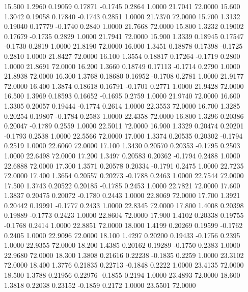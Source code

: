   15.500   1.2960   0.19059   0.17871  -0.1745   0.2864   1.0000  21.7041  72.0000
  15.600   1.3042   0.19058   0.17840  -0.1743   0.2851   1.0000  21.7370  72.0000
  15.700   1.3132   0.19040   0.17779  -0.1740   0.2840   1.0000  21.7668  72.0000
  15.800   1.3232   0.19002   0.17679  -0.1735   0.2829   1.0000  21.7941  72.0000
  15.900   1.3339   0.18945   0.17547  -0.1730   0.2819   1.0000  21.8190  72.0000
  16.000   1.3451   0.18878   0.17398  -0.1725   0.2810   1.0000  21.8427  72.0000
  16.100   1.3554   0.18817   0.17264  -0.1719   0.2800   1.0000  21.8691  72.0000
  16.200   1.3660   0.18749   0.17113  -0.1714   0.2790   1.0000  21.8938  72.0000
  16.300   1.3768   0.18680   0.16952  -0.1708   0.2781   1.0000  21.9177  72.0000
  16.400   1.3874   0.18618   0.16791  -0.1701   0.2771   1.0000  21.9428  72.0000
  16.500   1.3969   0.18593   0.16652  -0.1695   0.2759   1.0000  21.9740  72.0000
  16.600   1.3305   0.20057   0.19444  -0.1774   0.2614   1.0000  22.3553  72.0000
  16.700   1.3285   0.20254   0.19807  -0.1784   0.2583   1.0000  22.4358  72.0000
  16.800   1.3296   0.20386   0.20047  -0.1789   0.2559   1.0000  22.5011  72.0000
  16.900   1.3329   0.20474   0.20201  -0.1793   0.2538   1.0000  22.5566  72.0000
  17.000   1.3374   0.20535   0.20302  -0.1794   0.2519   1.0000  22.6060  72.0000
  17.100   1.3430   0.20570   0.20353  -0.1795   0.2503   1.0000  22.6498  72.0000
  17.200   1.3497   0.20583   0.20362  -0.1794   0.2488   1.0000  22.6888  72.0000
  17.300   1.3571   0.20578   0.20334  -0.1791   0.2475   1.0000  22.7235  72.0000
  17.400   1.3654   0.20557   0.20273  -0.1788   0.2463   1.0000  22.7544  72.0000
  17.500   1.3743   0.20522   0.20185  -0.1785   0.2453   1.0000  22.7821  72.0000
  17.600   1.3837   0.20475   0.20072  -0.1780   0.2443   1.0000  22.8069  72.0000
  17.700   1.3921   0.20442   0.19991  -0.1777   0.2433   1.0000  22.8345  72.0000
  17.800   1.4008   0.20398   0.19889  -0.1773   0.2423   1.0000  22.8604  72.0000
  17.900   1.4102   0.20338   0.19755  -0.1768   0.2414   1.0000  22.8851  72.0000
  18.000   1.4199   0.20269   0.19599  -0.1762   0.2405   1.0000  22.9096  72.0000
  18.100   1.4297   0.20200   0.19433  -0.1756   0.2395   1.0000  22.9355  72.0000
  18.200   1.4385   0.20162   0.19289  -0.1750   0.2383   1.0000  22.9680  72.0000
  18.300   1.3808   0.21616   0.22238  -0.1835   0.2259   1.0000  23.3102  72.0000
  18.400   1.3776   0.21835   0.22713  -0.1848   0.2222   1.0000  23.4135  72.0000
  18.500   1.3788   0.21956   0.22976  -0.1855   0.2194   1.0000  23.4893  72.0000
  18.600   1.3818   0.22038   0.23152  -0.1859   0.2172   1.0000  23.5501  72.0000
